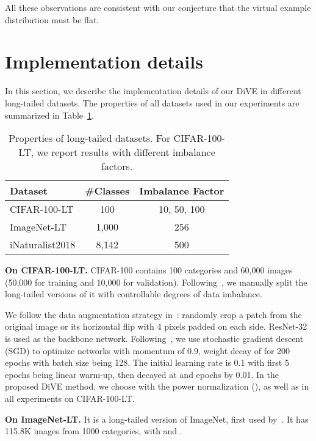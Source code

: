 \documentclass[10pt,twocolumn,letterpaper]{article}
\begin{document}
All these observations are consistent with our conjecture that the virtual example distribution must be flat.

\section{Implementation details}

In this section, we describe the implementation details of our DiVE in different long-tailed datasets. The properties of all datasets used in our experiments are summarized in Table~\ref{dataset_info_table}. 

\begin{table}
    \caption{Properties of long-tailed datasets. For CIFAR-100-LT, we report results with different imbalance factors.}
     \centering
     \begin{tabular}{lcc}
         \hline
         Dataset & \#Classes  & Imbalance Factor \\
         \hline \hline
         CIFAR-100-LT & \phantom{0}100 & 10, 50, 100\\
         ImageNet-LT & 1,000 & 256\\
         iNaturalist2018 & 8,142 & 500 \\
         \hline
     \end{tabular}
     \label{dataset_info_table}
 \end{table}

\textbf{On CIFAR-100-LT.}
CIFAR-100 contains 100 categories and 60,000 images (50,000 for training and 10,000 for validation). Following~\cite{zhou2020BBN}, we manually split the long-tailed versions of it with controllable degrees of data imbalance. 

We follow the data augmentation strategy in~\cite{he2016deep}: randomly crop a  patch from the original image or its horizontal flip with 4 pixels padded on each side. ResNet-32~\cite{he2016deep} is used as the backbone network. Following~\cite{zhou2020BBN}, we use stochastic gradient descent (SGD) to optimize networks with momentum of 0.9, weight decay of  for 200 epochs with batch size being 128. The initial learning rate is 0.1 with first 5 epochs being linear warm-up, then decayed at  and  epochs by 0.01. In the proposed DiVE method, we choose  with the power normalization (), as well as  in all experiments on CIFAR-100-LT.

\textbf{On ImageNet-LT.}
It is a long-tailed version of ImageNet, first used by~\cite{liu2019openlongtailrecognition}. It has 115.8K images from 1000 categories, with  and .
\end{document}
